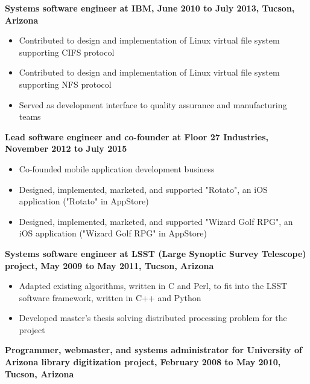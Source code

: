 \documentclass[10pt]{res}
\begin{document}
\begin{resume}
\begin{flushleft}
{\bf Systems software engineer at IBM, June 2010 to July 2013, Tucson, Arizona}
\end{flushleft}

\begin{itemize}
\setlength{\itemsep}{1pt}
\setlength{\parskip}{0pt}
\setlength{\parsep}{0pt}
\item Contributed to design and implementation of Linux virtual file system supporting CIFS protocol
\item Contributed to design and implementation of Linux virtual file system supporting NFS protocol
\item Served as development interface to quality assurance and manufacturing teams
\end{itemize}

\begin{flushleft}
{\bf Lead software engineer and co-founder at Floor 27 Industries, November 2012 to July 2015}
\end{flushleft}

\begin{itemize}
\setlength{\itemsep}{1pt}
\setlength{\parskip}{0pt}
\setlength{\parsep}{0pt}
\item Co-founded mobile application development business
\item Designed, implemented, marketed, and supported "Rotato", an iOS application ("Rotato" in AppStore)
\item Designed, implemented, marketed, and supported "Wizard Golf RPG", an iOS application ("Wizard Golf RPG" in AppStore)
\end{itemize}

\begin{flushleft}
{\bf Systems software engineer at LSST (Large Synoptic Survey Telescope) project, May 2009 to May 2011, Tucson, Arizona}
\end{flushleft}

\begin{itemize}
\setlength{\itemsep}{1pt}
\setlength{\parskip}{0pt}
\setlength{\parsep}{0pt}
\item Adapted existing algorithms, written in C and Perl, to fit into the LSST software framework, written in C++ and Python
\item Developed master's thesis  solving distributed processing problem for the project
\end{itemize}


\begin{flushleft}
{\bf Programmer, webmaster, and systems administrator for University of Arizona library digitization project, February 2008 to May 2010, Tucson, Arizona}
\end{flushleft}


\end{resume}
\end{document}
